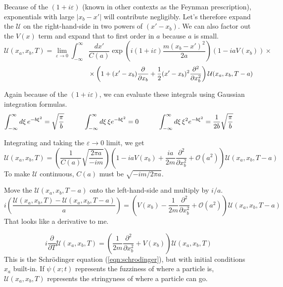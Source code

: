\documentclass[12pt]{article}
\begin{document}
Because of the $(1+i\varepsilon)$ (known in other contexts as the
Feynman prescription), exponentials with large $|x_b - x'|$ will
contribute negligibly.  Let's therefore expand the $\mathcal{U}$ on
the right-hand-side in two powers of $(x' - x_b)$.  We can also factor
out the $V(x)$ term and expand that to first order in $a$ because $a$
is small.
\[
  \mathcal{U}(x_a, x_b, T) = \lim_{\varepsilon \to 0}
  \int_{-\infty}^\infty \frac{dx'}{C(a)} \exp \left(i (1 +
  i\varepsilon) \frac{m(x_b - x')^2}{2 a} \right) \left(1 - iaV(x_b)
  \right) \times
\]
\begin{equation}
  \mbox{\hspace{4.5 cm}} \times \left(1 + (x' -
  x_b)\frac{\partial}{\partial x_b} + \frac{1}{2}(x' - x_b)^2
  \frac{\partial^2}{\partial x_b^2}\right) \mathcal{U}(x_a, x_b, T - a)
\end{equation}

Again because of the $(1+i\varepsilon)$, we can evaluate these
integrals using Gaussian integration formulas.
\begin{equation}
  \int_{-\infty}^\infty d\xi \, e^{-b \xi^2} = \sqrt{\frac{\pi}{b}} \mbox{\hspace{1 cm}}
  \int_{-\infty}^\infty d\xi \, \xi e^{-b \xi^2} = 0 \mbox{\hspace{1 cm}}
  \int_{-\infty}^\infty d\xi \, \xi^2 e^{-b \xi^2} = \frac{1}{2b} \sqrt{\frac{\pi}{b}} \mbox{\hspace{1 cm}}
\end{equation}

Integrating and taking the $\varepsilon \to 0$ limit, we get
\begin{equation}
  \mathcal{U}(x_a, x_b, T) = \left(\frac{1}{C(a)} \sqrt{\frac{2 \pi
  a}{-i m}} \right) \left(1 - iaV(x_b) + \frac{ia}{2m}
  \frac{\partial^2}{\partial x_b^2} + \mathcal{O}(a^2) \right)
  \mathcal{U}(x_a, x_b, T - a)
\end{equation}
To make $\mathcal{U}$ continuous, $C(a)$ must be $\sqrt{-im/2\pi a}$.

Move the $\mathcal{U}(x_a,x_b,T-a)$ onto the left-hand-side and
multiply by $i/a$.
\begin{equation}
  i\left(\frac{\mathcal{U}(x_a,x_b,T) - \mathcal{U}(x_a,x_b,T-a)}{a} \right) =
  \left( V(x_b) - \frac{1}{2m}\frac{\partial^2}{\partial x_b^2} +
  \mathcal{O}(a^2)\right) \mathcal{U}(x_a,x_b,T-a)
\end{equation}
That looks like a derivative to me.

\begin{equation}
  i \frac{\partial}{\partial T} \mathcal{U}(x_a, x_b, T) =
  \left(\frac{1}{2m} \frac{\partial^2}{\partial x_b^2} + V(x_b)
  \right) \mathcal{U}(x_a, x_b, T)
\end{equation}
This is the Schr\"odinger equation (\ref{eqn:schrodinger}), but with
initial conditions $x_a$ built-in.  If $\psi(x;t)$ represents the
fuzziness of where a particle is, $\mathcal{U}(x_a, x_b, T)$
represents the stringyness of where a particle can go.
\end{document}
